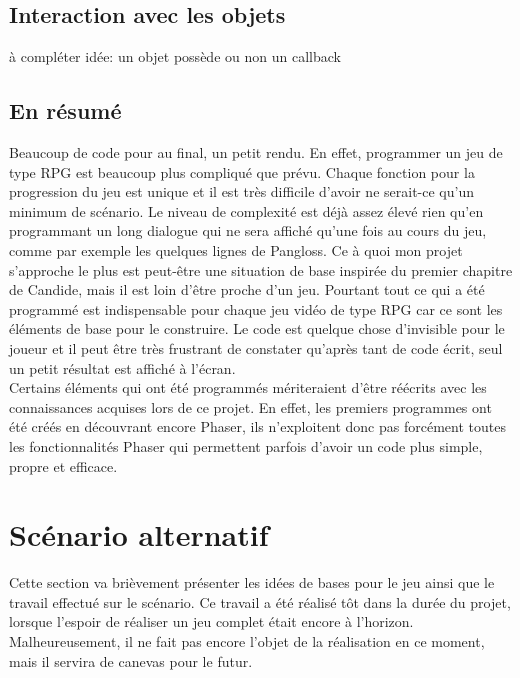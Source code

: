 \documentclass[11pt]{article}
\begin{document}
\subsection{Interaction avec les objets}
à compléter idée: un objet possède ou non un callback 


\subsection{En résumé}
Beaucoup de code pour au final, un petit rendu. En effet, programmer un jeu de type RPG est beaucoup plus compliqué que prévu. Chaque fonction pour la progression du jeu est unique et il est très difficile d'avoir ne serait-ce qu'un minimum de scénario. Le niveau de complexité est déjà assez élevé rien qu'en programmant un long dialogue qui ne sera affiché qu'une fois au cours du jeu, comme par exemple les quelques lignes de Pangloss. Ce à quoi mon projet s'approche le plus est peut-être une situation de base inspirée du premier chapitre de Candide, mais il est loin d'être proche d'un jeu. Pourtant tout ce qui a été programmé est indispensable pour chaque jeu vidéo de type RPG car ce sont les éléments de base pour le construire. Le code est quelque chose d'invisible pour le joueur et il peut être très frustrant de constater qu'après tant de code écrit, seul un petit résultat est affiché à l'écran. \\

Certains éléments qui ont été programmés mériteraient d'être réécrits avec les connaissances acquises lors de ce projet. En effet, les premiers programmes ont été créés en découvrant encore Phaser, ils n'exploitent donc pas forcément toutes les fonctionnalités Phaser qui permettent parfois d'avoir un code plus simple, propre et efficace.\\
\section{Scénario alternatif}
Cette section va brièvement présenter les idées de bases pour le jeu ainsi que le travail effectué sur le scénario. Ce travail a été réalisé tôt dans la durée du projet, lorsque l'espoir de réaliser un jeu complet était encore à l'horizon. Malheureusement, il ne fait pas encore l'objet de la réalisation en ce moment, mais il servira de canevas pour le futur.\\
\end{document}
